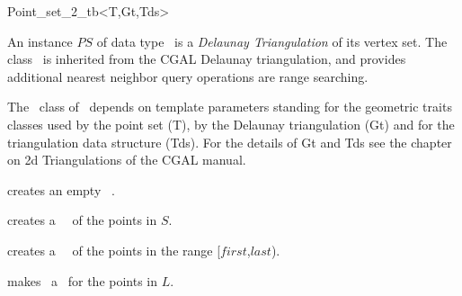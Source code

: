 \begin{ccRefClass}{Point_set_2_tb<T,Gt,Tds>}

\ccDefinition


An instance $PS$ of data type \ccRefName\  is a {\em Delaunay Triangulation}
of its vertex set. The class \ccRefName\ is inherited from the CGAL Delaunay triangulation,
and provides additional nearest neighbor query operations are range searching.

The \ccRefName\ class of \cgal\ depends on template parameters standing for the
geometric traits classes used by the point set (T), by the Delaunay triangulation (Gt)
and for the triangulation data structure (Tds). 
For the details of Gt and Tds see the chapter on 2d Triangulations of the CGAL manual.




\ccHtmlLinksOff


\ccTypes
{}
\ccThreeToTwo
{}

\ccHtmlLinksOn


\ccCreation

{creates an empty \ccRefName\ .}

{creates a \ccRefName\ \ccVar\ of the points in $S$. 
}

{creates a \ccRefName\ \ccVar\ of the points in the range
[$first$,$last$).}


\ccOperations

{ makes \ccVar\ a \ccRefName\ for the points in $L$.}


\end{ccRefClass}
